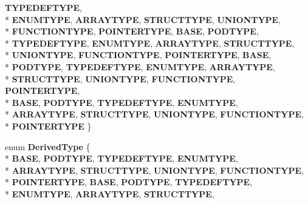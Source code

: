 \begin{DoxyCompactItemize}
{\bfseries T\-Y\-P\-E\-D\-E\-F\-T\-Y\-P\-E}, 
\\*
{\bfseries E\-N\-U\-M\-T\-Y\-P\-E}, 
{\bfseries A\-R\-R\-A\-Y\-T\-Y\-P\-E}, 
{\bfseries S\-T\-R\-U\-C\-T\-T\-Y\-P\-E}, 
{\bfseries U\-N\-I\-O\-N\-T\-Y\-P\-E}, 
\\*
{\bfseries F\-U\-N\-C\-T\-I\-O\-N\-T\-Y\-P\-E}, 
{\bfseries P\-O\-I\-N\-T\-E\-R\-T\-Y\-P\-E}, 
{\bfseries B\-A\-S\-E}, 
{\bfseries P\-O\-D\-T\-Y\-P\-E}, 
\\*
{\bfseries T\-Y\-P\-E\-D\-E\-F\-T\-Y\-P\-E}, 
{\bfseries E\-N\-U\-M\-T\-Y\-P\-E}, 
{\bfseries A\-R\-R\-A\-Y\-T\-Y\-P\-E}, 
{\bfseries S\-T\-R\-U\-C\-T\-T\-Y\-P\-E}, 
\\*
{\bfseries U\-N\-I\-O\-N\-T\-Y\-P\-E}, 
{\bfseries F\-U\-N\-C\-T\-I\-O\-N\-T\-Y\-P\-E}, 
{\bfseries P\-O\-I\-N\-T\-E\-R\-T\-Y\-P\-E}, 
{\bfseries B\-A\-S\-E}, 
\\*
{\bfseries P\-O\-D\-T\-Y\-P\-E}, 
{\bfseries T\-Y\-P\-E\-D\-E\-F\-T\-Y\-P\-E}, 
{\bfseries E\-N\-U\-M\-T\-Y\-P\-E}, 
{\bfseries A\-R\-R\-A\-Y\-T\-Y\-P\-E}, 
\\*
{\bfseries S\-T\-R\-U\-C\-T\-T\-Y\-P\-E}, 
{\bfseries U\-N\-I\-O\-N\-T\-Y\-P\-E}, 
{\bfseries F\-U\-N\-C\-T\-I\-O\-N\-T\-Y\-P\-E}, 
{\bfseries P\-O\-I\-N\-T\-E\-R\-T\-Y\-P\-E}, 
\\*
{\bfseries B\-A\-S\-E}, 
{\bfseries P\-O\-D\-T\-Y\-P\-E}, 
{\bfseries T\-Y\-P\-E\-D\-E\-F\-T\-Y\-P\-E}, 
{\bfseries E\-N\-U\-M\-T\-Y\-P\-E}, 
\\*
{\bfseries A\-R\-R\-A\-Y\-T\-Y\-P\-E}, 
{\bfseries S\-T\-R\-U\-C\-T\-T\-Y\-P\-E}, 
{\bfseries U\-N\-I\-O\-N\-T\-Y\-P\-E}, 
{\bfseries F\-U\-N\-C\-T\-I\-O\-N\-T\-Y\-P\-E}, 
\\*
{\bfseries P\-O\-I\-N\-T\-E\-R\-T\-Y\-P\-E}
 \}
\item 
enum {\bfseries Derived\-Type} \{ \\*
{\bfseries B\-A\-S\-E}, 
{\bfseries P\-O\-D\-T\-Y\-P\-E}, 
{\bfseries T\-Y\-P\-E\-D\-E\-F\-T\-Y\-P\-E}, 
{\bfseries E\-N\-U\-M\-T\-Y\-P\-E}, 
\\*
{\bfseries A\-R\-R\-A\-Y\-T\-Y\-P\-E}, 
{\bfseries S\-T\-R\-U\-C\-T\-T\-Y\-P\-E}, 
{\bfseries U\-N\-I\-O\-N\-T\-Y\-P\-E}, 
{\bfseries F\-U\-N\-C\-T\-I\-O\-N\-T\-Y\-P\-E}, 
\\*
{\bfseries P\-O\-I\-N\-T\-E\-R\-T\-Y\-P\-E}, 
{\bfseries B\-A\-S\-E}, 
{\bfseries P\-O\-D\-T\-Y\-P\-E}, 
{\bfseries T\-Y\-P\-E\-D\-E\-F\-T\-Y\-P\-E}, 
\\*
{\bfseries E\-N\-U\-M\-T\-Y\-P\-E}, 
{\bfseries A\-R\-R\-A\-Y\-T\-Y\-P\-E}, 
{\bfseries S\-T\-R\-U\-C\-T\-T\-Y\-P\-E}, 

\end{DoxyCompactItemize}
